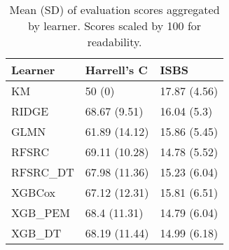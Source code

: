 \begin{table}
\centering
\caption{Mean (SD) of evaluation scores aggregated by learner. Scores scaled by 100 for readability.\label{tab:bm-aggr}}
\centering
\begin{tabular}[t]{lll}
\toprule
Learner & Harrell's C & ISBS\\
\midrule
KM & 50 (0) & 17.87 (4.56)\\
RIDGE & 68.67 (9.51) & 16.04 (5.3)\\
GLMN & 61.89 (14.12) & 15.86 (5.45)\\
RFSRC & 69.11 (10.28) & 14.78 (5.52)\\
RFSRC\_DT & 67.98 (11.36) & 15.23 (6.04)\\
XGBCox & 67.12 (12.31) & 15.81 (6.51)\\
XGB\_PEM & 68.4 (11.31) & 14.79 (6.04)\\
XGB\_DT & 68.19 (11.44) & 14.99 (6.18)\\
\bottomrule
\end{tabular}
\end{table}
